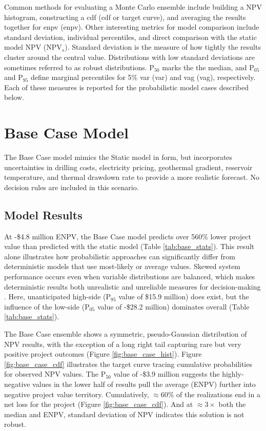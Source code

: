 Common methods for evaluating a Monte Carlo ensemble include building a NPV histogram, constructing a \acrlong{cdf} (\acrshort{cdf} or target curve), and averaging the results together for \acrlong{enpv} (\acrshort{enpv}). Other interesting metrics for model comparison include standard deviation, individual percentiles, and direct comparison with the static model NPV (NPV$_{s}$). Standard deviation is the measure of how tightly the results cluster around the central value. Distributions with low standard deviations are sometimes referred to as robust distributions. P$_{50}$ marks the the median, and P$_{05}$ and P$_{95}$ define marginal percentiles for 5\% \acrlong{var} (\acrshort{var}) and \acrlong{vag} (\acrshort{vag}), respectively. Each of these measures is reported for the probabilistic model cases described below.

\section{Base Case Model}\label{ch6:base_case}
The Base Case model mimics the Static model in form, but incorporates uncertainties in drilling costs, electricity pricing, geothermal gradient, reservoir temperature, and thermal drawdown rate to provide a more realistic forecast. No decision rules are included in this scenario. 

\subsection{Model Results}\label{ch6:base_results}
At -\$4.8 million ENPV, the Base Case model predicts over 560\% lower project value than predicted with the static model (Table \ref{tab:base_stats}). This result alone illustrates how probabilistic approaches can significantly differ from deterministic models that use most-likely or average values. Skewed system performance occurs even when variable distributions are balanced, which makes deterministic results both unrealistic and unreliable measures for decision-making \citep[p.\ 48-49]{de_neufville_flexibility_2011}. Here, unanticipated high-side (P$_{95}$ value of \$15.9 million) does exist, but the influence of the low-side (P$_{05}$ value of -\$28.2 million) dominates overall (Table \ref{tab:base_stats}).

The Base Case ensemble shows a symmetric, pseudo-Gaussian distribution of NPV results, with the exception of a long right tail capturing rare but very positive project outcomes (Figure \ref{fig:base_case_hist}). Figure \ref{fig:base_case_cdf} illustrates the target curve tracing cumulative probabilities for observed NPV values. The P$_{50}$ value of -\$3.9 million suggests the highly-negative values in the lower half of results pull the average (ENPV) further into negative project value territory. Cumulatively, $\approx60\%$ of the realizations end in a net loss for the project (Figure \ref{fig:base_case_cdf}). And at $\approx3\times$ both the median and ENPV, standard deviation of NPV indicates this solution is not robust. 

